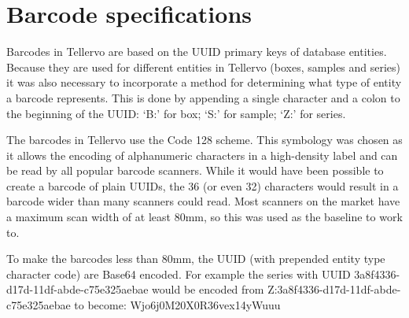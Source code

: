 \section{Barcode specifications}
\label{txt:barcodeSpecs}
Barcodes in Tellervo are based on the UUID primary keys of database entities.  Because they are used for different entities in Tellervo (boxes, samples and series) it was also necessary to incorporate a method for determining what type of entity a barcode represents. This is done by appending a single character and a colon to the beginning of the UUID: `B:' for box; `S:' for sample; `Z:' for series.

The barcodes in Tellervo use the Code 128 scheme. This symbology was chosen as it allows the encoding of alphanumeric characters in a high-density label and can be read by all popular barcode scanners. While it would have been possible to create a barcode of plain UUIDs, the 36 (or even 32) characters would result in a barcode wider than many scanners could read. Most scanners on the market have a maximum scan width of at least 80mm, so this was used as the baseline to work to.

To make the barcodes less than 80mm, the UUID (with prepended entity type character code) are Base64 encoded. For example the series with UUID 3a8f4336-d17d-11df-abde-c75e325aebae would be encoded from Z:3a8f4336-d17d-11df-abde-c75e325aebae to become: Wjo6j0M20X0R36vex14yWuuu 

